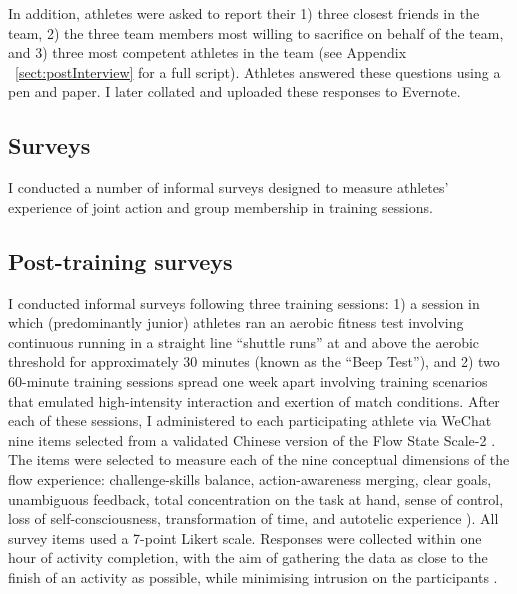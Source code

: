 \begin{CJK}{UTF8}{gbsn}
  In addition, athletes were asked to report their 1) three closest friends in the team, 2) the three team members most willing to sacrifice on behalf of the team, and 3) three most competent athletes in the team (see Appendix ~\ref{sect:postInterview} for a full script). Athletes answered these questions using a pen and paper. I later collated and uploaded these responses to Evernote.








\subsection{Surveys\label{sect:procSurveys}}

 I conducted a number of informal surveys designed to measure athletes' experience of joint action and group membership in training sessions.



  \subsection{Post-training surveys\label{sect:postTrainingSurveys}}
    I conducted informal surveys following three training sessions: 1) a session in which (predominantly junior) athletes ran an aerobic fitness test involving continuous running in a straight line ``shuttle runs''  at and above the aerobic threshold for approximately 30 minutes (known as the ``Beep Test''), and 2) two 60-minute training sessions spread one week apart involving training scenarios that emulated high-intensity interaction and exertion of match conditions.  After each of these sessions, I administered to each participating athlete via WeChat nine items selected from a validated Chinese version \citep{Liu2012} of the Flow State Scale-2 \citep{Jackson2002}.  The items were selected to measure each of the nine conceptual dimensions of the flow experience: challenge-skills balance, action-awareness merging, clear goals, unambiguous feedback, total concentration on the task at hand, sense of control, loss of self-consciousness, transformation of time, and autotelic experience \citep{Csikszentmihalyi1990}).  All survey items used a 7-point Likert scale.  Responses were collected within one hour of activity completion, with the aim of gathering the data as close to the finish of an activity as possible, while minimising intrusion on the participants \citep{Jackson2004}.



\end{CJK}
